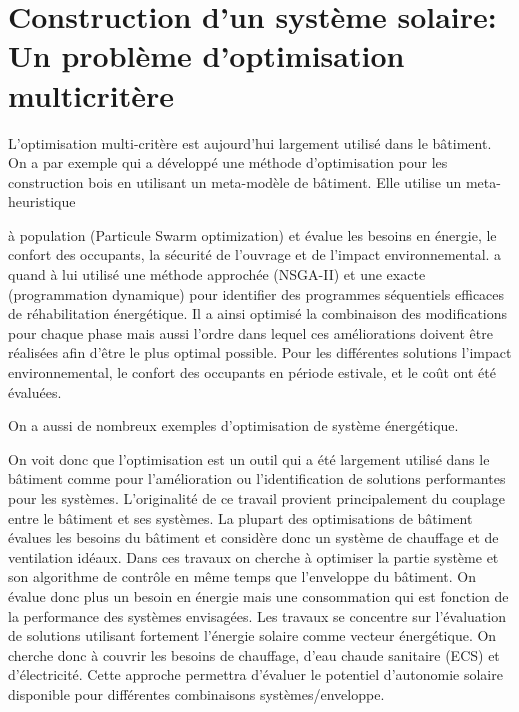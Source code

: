 
\section{Construction d’un système solaire: Un problème d’optimisation multicritère} %
\label{sec:construction_d_un_systeme_solaire_un_probleme_d_optimisation}


L’optimisation multi-critère est aujourd’hui largement utilisé dans le bâtiment.
On a par exemple \cite{Armand-Decker2015} qui a développé une méthode d’optimisation pour les
construction bois en utilisant un meta-modèle de bâtiment. Elle utilise un meta-heuristique

à population (Particule Swarm optimization) et évalue les besoins en énergie, le confort des
occupants, la sécurité de l’ouvrage et de l’impact environnemental. \cite{Rivallain2013}
a quand à lui utilisé une méthode approchée (NSGA-II) et une exacte (programmation dynamique)
pour identifier des programmes séquentiels efficaces de réhabilitation énergétique.
Il a ainsi optimisé la combinaison des modifications pour chaque phase mais aussi l’ordre
dans lequel ces améliorations doivent être réalisées afin d’être le plus optimal
possible.
Pour les différentes solutions l’impact environnemental, le confort des occupants en
période estivale, et le coût ont été évaluées.


On a aussi de nombreux exemples d’optimisation de système énergétique.

On voit donc que l’optimisation est un outil qui a été largement utilisé dans
le bâtiment comme pour l’amélioration ou l’identification de solutions performantes
pour les systèmes.
L’originalité de ce travail provient principalement du couplage entre le bâtiment
et ses systèmes. La plupart des optimisations de bâtiment évalues les besoins
du bâtiment et considère donc un système de chauffage et de ventilation idéaux.
Dans ces travaux on cherche à optimiser la partie système et son algorithme de
contrôle en même temps que l’enveloppe du bâtiment. On évalue donc plus un besoin
en énergie mais une consommation qui est fonction de la performance des systèmes
envisagées. Les travaux se concentre sur l’évaluation de solutions utilisant fortement
l’énergie solaire comme vecteur énergétique. On cherche donc à couvrir les besoins
de chauffage, d’eau chaude sanitaire (ECS) et d’électricité.
Cette approche permettra d’évaluer le potentiel d’autonomie solaire disponible
pour différentes combinaisons systèmes/enveloppe.

